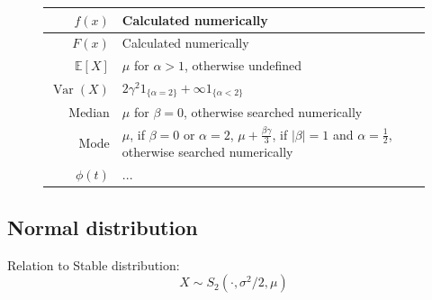 \documentclass[a4paper,11pt]{article}
\theoremstyle{plain}
\theoremstyle{definition}
\newcommand{\ME}{\mathbb{E}}
\newcommand{\Var}{\operatorname{Var}}
\begin{document}
\begin{figure}[!htb]
\begin{minipage}{0.4\textwidth}
\begin{tabular}{| r | l |}
			\hline
			$f(x)$ & Calculated numerically \\
			\hline
			$F(x)$ & Calculated numerically \\
			\hline
			$\ME[X]$ & \pbox{\linewidth}{$ \mu$ for $\alpha > 1$,\\ otherwise undefined} \\
			\hline
			$\Var(X)$ & $2 \gamma^2 1_{\{ \alpha = 2 \} } + \infty 1_{ \{ \alpha < 2 \} }  $ \\
			\hline
			Median & \pbox{\linewidth}{$\mu$ for $\beta = 0$,\\ otherwise searched numerically} \\
			\hline
			Mode & \pbox{\linewidth}{$\mu$, if $\beta = 0$ or $\alpha = 2$, \\  $\mu + \frac{\beta \gamma}{3}$, if $|\beta| = 1$ and $\alpha = \frac{1}{2}$, \\ otherwise searched numerically} \\
			\hline
			$\phi(t)$ & $ ...$ \\
			\hline
		\end{tabular}
	    \end{minipage}
	\end{figure}
	
	\subsection{Normal distribution}
	Relation to Stable distribution:
	\[X \sim S_{2}(\cdot, \sigma^2/2, \mu) \]
	
\end{document}
